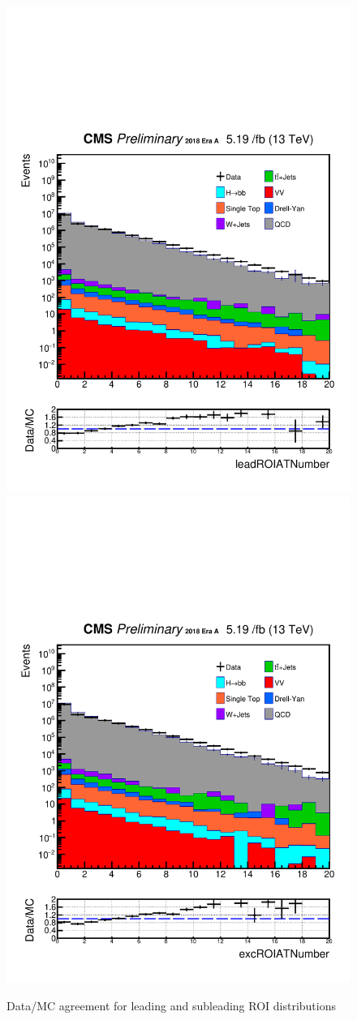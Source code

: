 \begin{figure}[h!]
  \caption{Data/MC agreement for leading and subleading ROI distributions}
  \label{fig:DataMCscore4}
  \centering
  \includegraphics[width=0.57\linewidth]{figs/Data_log_Oct6ANVars_MS-15_ctauS-10_leadROIATNumber.pdf}
  \includegraphics[width=0.57\linewidth]{figs/Data_log_Oct6ANVars_MS-15_ctauS-10_excROIATNumber.pdf}

\end{figure}

